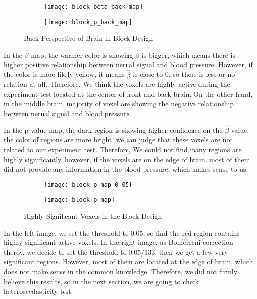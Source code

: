 \begin{figure}[ht]
\centering
\begin{subfigure}{.45\textwidth}
  \texttt{[image: block\_beta\_back\_map]}
\end{subfigure}%
\begin{subfigure}{.5\textwidth}
  \texttt{[image: block\_p\_back\_map]}
  \centering
\end{subfigure}
\caption{Back Perspective of Brain in Block Design\label{fig:bpBrain}}
\end{figure}

In the $\hat{\beta}$ map, the warmer color is showing $\hat{\beta}$ is 
bigger, which means there is higher positive relationship between nerual signal and
blood pressure. However, if the color is more likely yellow, it means 
$\hat{\beta}$ is close to 0, so there is less or no relation at all. 
Therefore, We think the voxels are highly active during the experiment test 
located at the center of front and back brain. On the other hand, in the middle
brain, majority of voxel are showing the negative relationship between nerual
signal and blood pressure.

In the p-value map, the dark region is showing higher confidence on the 
$\hat{\beta}$ value. the color of regions are more bright, we can judge that 
these voxels are not related to our experiment test. Therefore, We could not 
find many regions are highly significantly, however, if the voxels are on the 
edge of brain, most of them did not provide any information in the blood 
pressure, which makes sense to us.

\begin{figure}[ht]
\centering
\begin{subfigure}{.46\textwidth}
  \texttt{[image: block\_p\_map\_0\_05]}
  \centering
\end{subfigure}%
\begin{subfigure}{.44\textwidth}
  \texttt{[image: block\_p\_map]}
  \centering
\end{subfigure}
\caption{Highly Significant Voxels in the Block Design\label{fig:hsVoxels}}
\end{figure}

In the left image, we set the threshold to 0.05, so find the red region contains
highly significant active voxels. In the right image, as Bonferroni correction
theroy, we decide to set the threshold to 0.05/133, then we get a few very 
significant regions. However, most of them are located at the edge of brain, 
which does not make sense in the common knowledge. Therefore, we did not firmly
believe this results, so in the next section, we are going to check heteroscedasticity
test.

